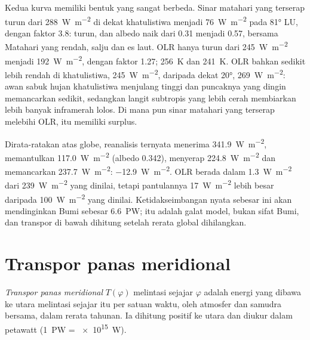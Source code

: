 Kedua kurva memiliki bentuk yang sangat berbeda. Sinar matahari yang terserap turun dari \qty{288}{W.m^{-2}} di dekat khatulistiwa menjadi \qty{76}{W.m^{-2}} pada \ang{81} LU, dengan faktor \num{3.8}:  turun, dan albedo naik dari \num{0.31} menjadi \num{0.57}, bersama Matahari yang rendah, salju dan es laut. OLR hanya turun dari \qty{245}{W.m^{-2}} menjadi \qty{192}{W.m^{-2}}, dengan faktor \num{1.27};  \qty{256}{K} dan \qty{241}{K}. OLR bahkan sedikit lebih rendah di khatulistiwa, \qty{245}{W.m^{-2}}, daripada dekat \ang{20}, \qty{269}{W.m^{-2}}: awan sabuk hujan khatulistiwa menjulang tinggi dan puncaknya yang dingin memancarkan sedikit, sedangkan langit subtropis yang lebih cerah membiarkan lebih banyak inframerah lolos. Di mana pun sinar matahari yang terserap melebihi OLR,  itu memiliki surplus.

\begin{example}\label{ex:b1:radiation-heat-transport:global}
Dirata-ratakan atas globe, reanalisis ternyata menerima \qty{341.9}{W.m^{-2}}, memantulkan \qty{117.0}{W.m^{-2}} (albedo \num{0.342}), menyerap \qty{224.8}{W.m^{-2}} dan memancarkan \qty{237.7}{W.m^{-2}}:  \qty{-12.9}{W.m^{-2}}. OLR berada dalam \qty{1.3}{W.m^{-2}} dari \qty{239}{W.m^{-2}} yang dinilai, tetapi pantulannya \qty{17}{W.m^{-2}} lebih besar daripada \qty{100}{W.m^{-2}} yang dinilai. Ketidakseimbangan nyata sebesar ini akan mendinginkan Bumi sebesar \qty{6.6}{PW}; itu adalah galat model, bukan sifat Bumi, dan transpor di bawah dihitung setelah rerata global dihilangkan.
\end{example}

\section{Transpor panas meridional}\label{sec:b1:radiation-heat-transport:transport}

\begin{definition}\label{def:b1:radiation-heat-transport:mht}
\emph{Transpor panas meridional} $T(\varphi)$
melintasi sejajar  $\varphi$ adalah energi yang dibawa ke utara melintasi sejajar
itu per satuan waktu, oleh atmosfer dan samudra bersama, dalam rerata tahunan. Ia dihitung
positif ke utara dan diukur dalam petawatt (\qty{1}{PW} = \qty{e15}{W}).
\end{definition}

